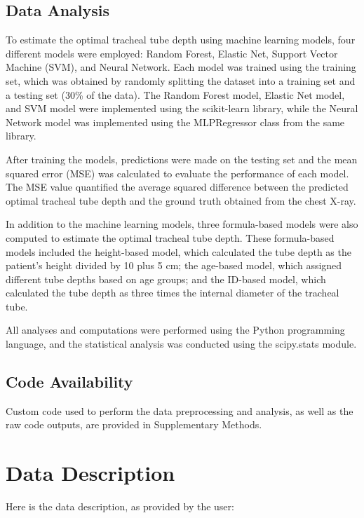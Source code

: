 \documentclass[11pt]{article}
\begin{document}
\subsection*{Data Analysis}
To estimate the optimal tracheal tube depth using machine learning models, four different models were employed: Random Forest, Elastic Net, Support Vector Machine (SVM), and Neural Network. Each model was trained using the training set, which was obtained by randomly splitting the dataset into a training set and a testing set (30\% of the data). The Random Forest model, Elastic Net model, and SVM model were implemented using the scikit-learn library, while the Neural Network model was implemented using the MLPRegressor class from the same library. 

After training the models, predictions were made on the testing set and the mean squared error (MSE) was calculated to evaluate the performance of each model. The MSE value quantified the average squared difference between the predicted optimal tracheal tube depth and the ground truth obtained from the chest X-ray. 

In addition to the machine learning models, three formula-based models were also computed to estimate the optimal tracheal tube depth. These formula-based models included the height-based model, which calculated the tube depth as the patient's height divided by 10 plus 5 cm; the age-based model, which assigned different tube depths based on age groups; and the ID-based model, which calculated the tube depth as three times the internal diameter of the tracheal tube.

All analyses and computations were performed using the Python programming language, and the statistical analysis was conducted using the scipy.stats module.\subsection*{Code Availability}

Custom code used to perform the data preprocessing and analysis, as well as the raw code outputs, are provided in Supplementary Methods.


\clearpage
\appendix

\section{Data Description} \label{sec:data_description} Here is the data description, as provided by the user:
\end{document}
